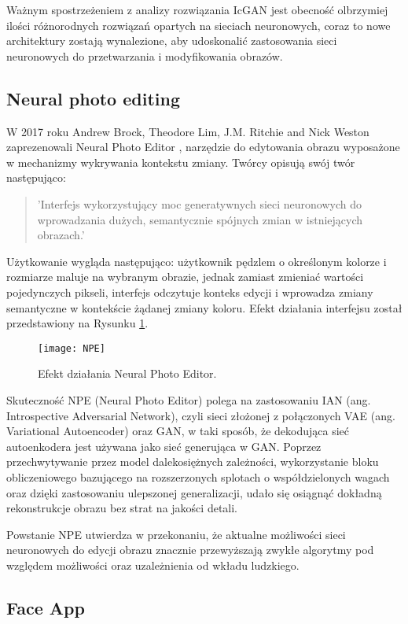     Ważnym spostrzeżeniem z analizy rozwiązania IcGAN jest obecność
    olbrzymiej ilości różnorodnych rozwiązań opartych na sieciach neuronowych,
    coraz to nowe architektury zostają wynalezione, aby udoskonalić
    zastosowania sieci neuronowych do przetwarzania i modyfikowania obrazów.

  \subsection{Neural photo editing}
    W 2017 roku Andrew Brock, Theodore Lim, J.M. Ritchie and Nick Weston
    zaprezenowali Neural Photo Editor \cite{neural_photo_editor}, narzędzie
    do edytowania obrazu wyposażone w mechanizmy wykrywania kontekstu zmiany.
    Twórcy opisują swój twór następująco:

    \begin{quote}
      'Interfejs wykorzystujący moc generatywnych sieci neuronowych do
      wprowadzania dużych, semantycznie spójnych zmian w istniejących obrazach.'
    \end{quote}

    Użytkowanie wygląda następująco: użytkownik pędzlem o określonym kolorze i
    rozmiarze maluje na wybranym obrazie, jednak zamiast zmieniać wartości
    pojedynczych pikseli, interfejs odczytuje konteks edycji i wprowadza zmiany
    semantyczne w kontekście żądanej zmiany koloru. Efekt działania interfejsu
    został przedstawiony na Rysunku \ref{fig:npe}.

    \begin{figure}[ht]
      \centering
      \texttt{[image: NPE]}
      \caption{Efekt działania Neural Photo Editor.}
      \label{fig:npe}
    \end{figure}

    Skuteczność NPE (Neural Photo Editor) polega na zastosowaniu IAN
    (ang. Introspective Adversarial Network), czyli sieci złożonej z połączonych
    VAE (ang. Variational Autoencoder) \cite{vae} oraz GAN, w taki sposób, że dekodująca
    sieć autoenkodera jest używana jako sieć generująca w GAN.
    Poprzez przechwytywanie przez model dalekosiężnych zależności, wykorzystanie
    bloku obliczeniowego bazującego na rozszerzonych splotach o
    współdzielonych wagach oraz dzięki zastosowaniu ulepszonej generalizacji,
    udało się osiągnąć dokładną rekonstrukcje obrazu bez strat na jakości detali.

    Powstanie NPE utwierdza w przekonaniu, że aktualne możliwości sieci
    neuronowych do edycji obrazu znacznie przewyższają zwykłe algorytmy pod
    względem możliwości oraz uzależnienia od wkładu ludzkiego.


  \subsection{Face App}

